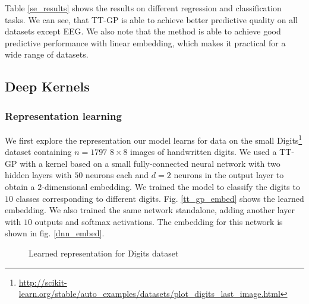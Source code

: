 Table \ref{se_results} shows the results on different regression and
classification tasks. We can see, that TT-GP is able to achieve better
predictive quality on all datasets except EEG. We also note that the
method is able to achieve good predictive performance with linear 
embedding, which makes it practical for a wide range of datasets.

\subsection{Deep Kernels}

  \subsubsection{Representation learning}
  We first explore the representation our model learns for data on the small
  Digits\footnote{\url{http://scikit-learn.org/stable/auto_examples/datasets/plot_digits_last_image.html}} 
  dataset containing $n = 1797$ $8 \times 8$ images of handwritten digits. We
  used a TT-GP with a kernel based on a small fully-connected neural network 
  with two hidden layers with $50$ neurons each and $d = 2$ neurons in the output
  layer to obtain a $2$-dimensional embedding. We trained the model to classify 
  the digits to $10$ classes corresponding to different digits.
  Fig. \ref{tt_gp_embed} shows the learned embedding. We also trained the same
  network standalone, adding another layer with $10$ outputs and softmax 
  activations. The embedding for this network is shown in fig. \ref{dnn_embed}.
  

  \begin{figure}[!h]
    \begin{center}
    \end{center}
    \caption{Learned representation for Digits dataset}
    \label{digits_embedding}
  \end{figure}
  
